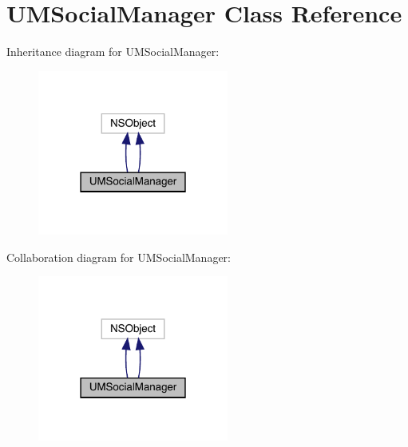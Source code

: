 \hypertarget{interface_u_m_social_manager}{}\section{U\+M\+Social\+Manager Class Reference}
\label{interface_u_m_social_manager}


Inheritance diagram for U\+M\+Social\+Manager\+:\nopagebreak
\begin{figure}[H]
\begin{center}
\leavevmode
\includegraphics[width=178pt]{interface_u_m_social_manager__inherit__graph}
\end{center}
\end{figure}


Collaboration diagram for U\+M\+Social\+Manager\+:\nopagebreak
\begin{figure}[H]
\begin{center}
\leavevmode
\includegraphics[width=178pt]{interface_u_m_social_manager__coll__graph}
\end{center}
\end{figure}
